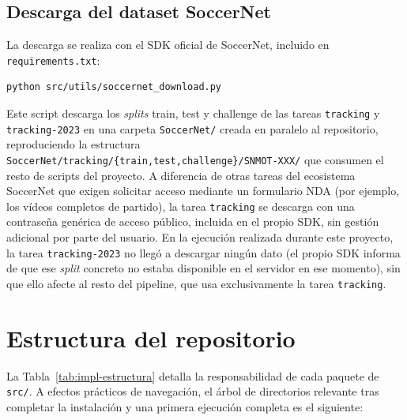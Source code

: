 \subsection{Descarga del dataset SoccerNet}
\label{subsec:manual-dataset}

La descarga se realiza con el SDK oficial de SoccerNet, incluido en
\texttt{requirements.txt}:

\begin{lstlisting}[language=bash]
python src/utils/soccernet_download.py
\end{lstlisting}

Este script descarga los \emph{splits} train, test y challenge de las
tareas \texttt{tracking} y \texttt{tracking-2023} en una carpeta
\texttt{SoccerNet/} creada en paralelo al repositorio, reproduciendo la estructura
\texttt{SoccerNet/tracking/\{train,test,challenge\}/SNMOT-XXX/} que
consumen el resto de scripts del proyecto. A diferencia de otras tareas del
ecosistema SoccerNet que exigen solicitar acceso mediante un formulario
NDA (por ejemplo, los vídeos completos de partido), la tarea
\texttt{tracking} se descarga con una contraseña genérica de acceso
público, incluida en el propio SDK, sin gestión adicional por parte
del usuario. En la ejecución realizada durante este proyecto, la tarea
\texttt{tracking-2023} no llegó a descargar ningún dato (el propio SDK
informa de que ese \emph{split} concreto no estaba disponible en el
servidor en ese momento), sin que ello afecte al resto del pipeline, que
usa exclusivamente la tarea \texttt{tracking}.

\section{Estructura del repositorio}
\label{sec:manual-estructura}

La Tabla~\ref{tab:impl-estructura}
detalla la responsabilidad de cada paquete de \texttt{src/}. A efectos
prácticos de navegación, el árbol de directorios relevante tras completar
la instalación y una primera ejecución completa es el siguiente:

